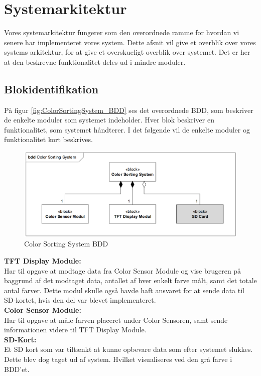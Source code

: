 \graphicspath{{Chapters/Diskussion/}}


\section{Systemarkitektur}


Vores systemarkitektur fungerer som den overordnede ramme for hvordan vi senere har implementeret vores system. Dette afsnit vil give et overblik over vores systems arkitektur, for at give et overskueligt overblik over systemet. Det er her at den beskrevne funktionalitet deles ud i mindre moduler. 

\subsection{Blokidentifikation}
På figur \autoref{fig:ColorSortingSystem_BDD}  ses det overordnede BDD, som beskriver de enkelte moduler som systemet indeholder. Hver blok beskriver en funktionalitet, som systemet håndterer. I det følgende vil de enkelte moduler og funktionalitet kort beskrives.

\begin{figure}[H]
	\centering
	\includegraphics[width = 400pt]{Img/ColorSortingSystem_BDD.png}
	\caption{Color Sorting System BDD}
	\label{fig:ColorSortingSystem_BDD}
\end{figure}

\textbf{TFT Display Module:} \\
Har til opgave at modtage data fra Color Sensor Module og vise brugeren på baggrund af det modtaget data, antallet af hver enkelt farve målt, samt det totale antal farver. Dette modul skulle også havde haft ansvaret for at sende data til SD-kortet, hvis den del var blevet implementeret. 
\\\textbf{Color Sensor Module:} \\
Har til opgave at måle farven placeret under Color Sensoren, samt sende informationen videre til TFT Display Module.
\\\textbf{SD-Kort:}\\
Et SD kort som var tiltænkt at kunne opbevare data som efter systemet slukkes. Dette blev dog taget ud af system. Hvilket visualiseres ved den grå farve i BDD’et.  

